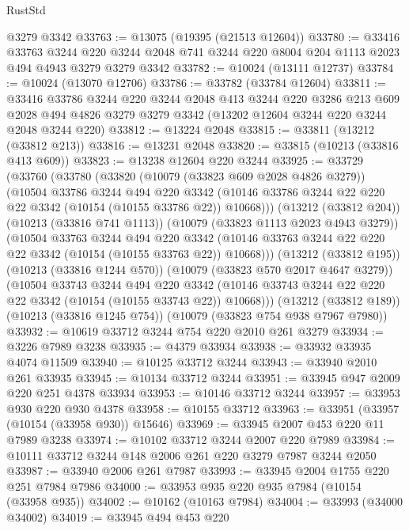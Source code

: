 \begin{lexlean}{RustStd}
\begin{coremodule}
{\begin{coremodule}
{{{{{{{{{{{{{{{{{{{{{{{{{{    @3279
    @3342
@33763 := @13075 (@19395 (@21513 @12604))
@33780 := @33416
    @33763
    @3244
    @220
    @3244
    @2048
    @741
    @3244
    @220
    @8004
    @204
    @1113
    @2023
    @494
    @4943
    @3279
    @3279
    @3342
@33782 := @10024 (@13111 @12737)
@33784 := @10024 (@13070 @12706)
@33786 := @33782 (@33784 @12604)
@33811 := @33416
    @33786
    @3244
    @220
    @3244
    @2048
    @413
    @3244
    @220
    @3286
    @213
    @609
    @2028
    @494
    @4826
    @3279
    @3279
    @3342
    (@13202 @12604 @3244 @220 @3244 @2048 @3244 @220)
@33812 := @13224 @2048
@33815 := @33811 (@13212 (@33812 @213))
@33816 := @13231 @2048
@33820 := @33815 (@10213 (@33816 @413 @609))
@33823 := @13238 @12604 @220 @3244
@33925 := @33729
    (@33760
      (@33780
        (@33820
          (@10079 (@33823 @609 @2028 @4826 @3279))
          (@10504
            @33786
            @3244
            @494
            @220
            @3342
            (@10146 @33786 @3244 @22 @220 @22 @3342 (@10154 (@10155 @33786 @22)) @10668)))
        (@13212 (@33812 @204))
        (@10213 (@33816 @741 @1113))
        (@10079 (@33823 @1113 @2023 @4943 @3279))
        (@10504
          @33763
          @3244
          @494
          @220
          @3342
          (@10146 @33763 @3244 @22 @220 @22 @3342 (@10154 (@10155 @33763 @22)) @10668)))
      (@13212 (@33812 @195))
      (@10213 (@33816 @1244 @570))
      (@10079 (@33823 @570 @2017 @4647 @3279))
      (@10504
        @33743
        @3244
        @494
        @220
        @3342
        (@10146 @33743 @3244 @22 @220 @22 @3342 (@10154 (@10155 @33743 @22)) @10668)))
    (@13212 (@33812 @189))
    (@10213 (@33816 @1245 @754))
    (@10079 (@33823 @754 @938 @7967 @7980))
@33932 := @10619 @33712 @3244 @754 @220 @2010 @261 @3279
@33934 := @3226 @7989 @3238
@33935 := @4379 @33934
@33938 := @33932 @33935 @4074 @11509
@33940 := @10125 @33712 @3244
@33943 := @33940 @2010 @261 @33935
@33945 := @10134 @33712 @3244
@33951 := @33945 @947 @2009 @220 @251 @4378 @33934
@33953 := @10146 @33712 @3244
@33957 := @33953 @930 @220 @930 @4378
@33958 := @10155 @33712
@33963 := @33951 (@33957 (@10154 (@33958 @930)) @15646)
@33969 := @33945 @2007 @453 @220 @11 @7989 @3238
@33974 := @10102 @33712 @3244 @2007 @220 @7989
@33984 := @10111 @33712 @3244 @148 @2006 @261 @220 @3279 @7987 @3244 @2050
@33987 := @33940 @2006 @261 @7987
@33993 := @33945 @2004 @1755 @220 @251 @7984 @7986
@34000 := @33953 @935 @220 @935 @7984 (@10154 (@33958 @935))
@34002 := @10162 (@10163 @7984)
@34004 := @33993 (@34000 @34002)
@34019 := @33945
    @494
    @453
    @220
}}}}}}}}}}}}}}}}}}}}}}}}}}
\end{coremodule}}
\end{coremodule}
\end{lexlean}

